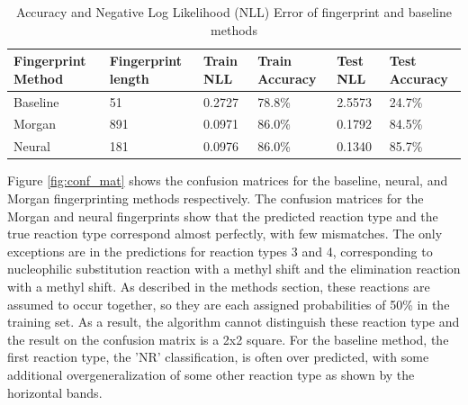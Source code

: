 \begin{table}
    \centering
    \label{tab:cross_val_results}
    \begin{tabular}{ |K|K|L|L|L|L|}
         \hline
         \textbf{Fingerprint Method} & \textbf{Fingerprint length} & \textbf{Train NLL} & \textbf{Train Accuracy} & \textbf{Test NLL} &  \textbf{Test Accuracy} \\ 
        \hline
        Baseline & 51 & 0.2727 & 78.8\% & 2.5573 & 24.7\%  \\ 
        \hline
        Morgan  & 891 & 0.0971 & 86.0\%  & 0.1792 & 84.5\%  \\ 
        Neural  &  181 & 0.0976 & 86.0\% & 0.1340 & 85.7\% \\ 
        \hline
    \end{tabular} 
    \caption{Accuracy and Negative Log Likelihood (NLL) Error of fingerprint and baseline methods} 
\end{table}  

Figure \ref{fig:conf_mat} shows the confusion matrices for the baseline, neural, and Morgan fingerprinting methods respectively. The confusion matrices for the Morgan and neural fingerprints show that the predicted reaction type and the true reaction type correspond almost perfectly, with few mismatches. The only exceptions are in the predictions for reaction types 3 and 4, corresponding to nucleophilic substitution reaction with a methyl shift and the elimination reaction with a methyl shift. As described in the methods section, these reactions are assumed to occur together, so they are each assigned probabilities of 50\% in the training set. As a result, the algorithm cannot distinguish these reaction type and the result on the confusion matrix is a 2x2 square. For the baseline method, the first reaction type, the 'NR' classification, is often over predicted, with some additional overgeneralization of some other reaction type as shown by the horizontal bands.


